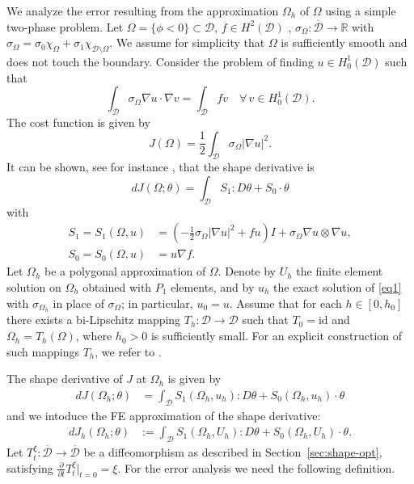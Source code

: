 \documentclass[preprint,9pt]{elsarticle}
\newcommand{\Om}{\Omega}
\newcommand{\divv}{\operatorname{div}}
\newcommand{\ta}{\theta}
\begin{document}
We analyze the error resulting from the approximation $\Om_h$ of $\Om$ using a simple two-phase problem.
Let $\Om= \{\phi < 0\}\subset \mathcal{D}$, $f\in H^2(\mathcal{D})$ , $\sigma_{\Omega}\colon\overline{\mathcal{D}}\to\mathds{R}$ 
with $\sigma_{\Omega} = \sigma_0\chi_{\Omega} + \sigma_1\chi_{\overline{\mathcal{D}}\setminus\Omega}$.
We assume for simplicity that $\Om$ is sufficiently smooth and does not touch the boundary. 
Consider the problem of finding $u\in H^1_{0}(\mathcal{D})$ such that
\begin{equation}
	\label{eq1}  \int_{\mathcal{D}} \sigma_{\Omega} \nabla u \cdot \nabla v =
	\int_{\mathcal{D}} f v
	\quad
	\forall \, v \in  H^1_{0}(\mathcal{D}).
\end{equation}
The cost function is given by
$$J(\Om) = \frac{1}{2} \int_{\mathcal{D}} \sigma_\Om|\nabla u|^2.$$
It can be shown, see for instance \cite{LAURAIN2020328}, that the shape derivative is
$$dJ(\Om;\ta) = \int_{\mathcal{D}} S_1 : D\ta +S_0 \cdot\ta $$
with
\begin{align*}
S_1 = S_1(\Om,u) &= \left(-\frac{1}{2} \sigma_\Om |\nabla u|^2 + fu\right) I + \sigma_\Om\nabla u\otimes\nabla u,\\
S_0= S_0(\Om,u) & = u\nabla f.
\end{align*}  
Let $\Omega_h$ be a polygonal approximation of $\Omega$. 
Denote by $U_h$ the finite element solution on $\Omega_h$ obtained with $P_1$ elements, and by $u_h$ the exact solution of \eqref{eq1} with $\sigma_{\Omega_h}$ in place of $\sigma_\Omega$; in particular, $u_0 = u$.
Assume that for each $h \in [0,h_0]$ there exists a bi-Lipschitz mapping $T_h : \mathcal{D} \to \mathcal{D}$ such that $T_0 = \mathrm{id}$ and
$\Omega_h = T_h(\Omega)$,
where $h_0 > 0$ is sufficiently small.
For an explicit construction of such mappings $T_h$, we refer to \cite[Section~7]{Gross}.

The shape derivative of $J$ at $\Om_h$ is given by
\begin{align*}
dJ(\Om_h;\ta) & = \int_{\mathcal{D}} S_1(\Om_h,u_h) : D\ta +S_0(\Om_h,u_h) \cdot\ta
\end{align*}  
and we intoduce the FE approximation of the shape derivative:
\begin{align*}
dJ_h(\Om_h;\ta) & := \int_{\mathcal{D}} S_1(\Om_h,U_h) : D\ta + S_0(\Om_h,U_h) \cdot\ta .
\end{align*}  
Let $T_t^\xi\colon\overline{\mathcal{D}}\to\overline{\mathcal{D}}$ be a diffeomorphism as described in Section~\ref{sec:shape-opt}, satisfying
 $\frac{\partial}{\partial t} T_t^\xi|_{t=0}=\xi$. 
 For the error analysis we need the following  definition.
\end{document}
